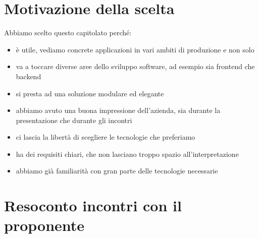 \documentclass[12pt]{article}
\begin{document}
\section*{Motivazione della scelta}

Abbiamo scelto questo capitolato perché:
\begin{itemize}
    \item è utile, vediamo concrete applicazioni in vari ambiti di produzione e non solo
    \item va a toccare diverse aree dello sviluppo software, ad esempio sia frontend che backend
    \item si presta ad una soluzione modulare ed elegante
    \item abbiamo avuto una buona impressione dell'azienda, sia durante la presentazione che durante gli incontri
    \item ci lascia la libertà di scegliere le tecnologie che preferiamo
    \item ha dei requisiti chiari, che non lasciano troppo spazio all'interpretazione
    \item abbiamo già familiarità con gran parte delle tecnologie necessarie
\end{itemize}

\section*{Resoconto incontri con il proponente}
\end{document}
